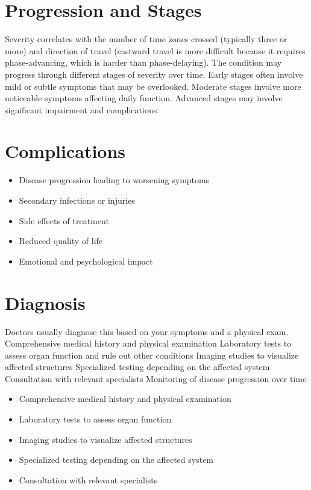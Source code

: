 \section{Progression and Stages}
Severity correlates with the number of time zones crossed (typically three or more) and direction of travel (eastward travel is more difficult because it requires phase-advancing, which is harder than phase-delaying). The condition may progress through different stages of severity over time. Early stages often involve mild or subtle symptoms that may be overlooked. Moderate stages involve more noticeable symptoms affecting daily function. Advanced stages may involve significant impairment and complications.
\section{Complications}
\begin{itemize}[noitemsep]
  \item Disease progression leading to worsening symptoms
  \item Secondary infections or injuries
  \item Side effects of treatment
  \item Reduced quality of life
  \item Emotional and psychological impact
\end{itemize}
\section{Diagnosis}
Doctors usually diagnose this based on your symptoms and a physical exam. Comprehensive medical history and physical examination Laboratory tests to assess organ function and rule out other conditions Imaging studies to visualize affected structures Specialized testing depending on the affected system Consultation with relevant specialists Monitoring of disease progression over time

\begin{itemize}[noitemsep]
  \item Comprehensive medical history and physical examination
  \item Laboratory tests to assess organ function
  \item Imaging studies to visualize affected structures
  \item Specialized testing depending on the affected system
  \item Consultation with relevant specialists
\end{itemize}
